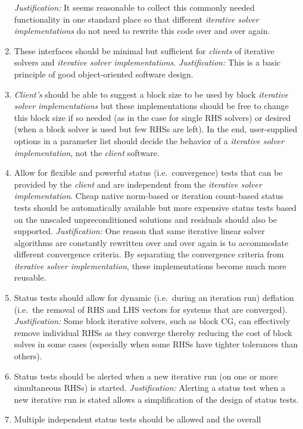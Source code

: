 \documentclass[pdf,ps2pdf,11pt]{SANDreport}
\begin{document}
\begin{enumerate}
{}\textit{Justification:} It seems reasonable to collect this commonly
needed functionality in one standard place so that different
{}\textit{iterative solver implementations} do not need to rewrite
this code over and over again.
\item
These interfaces should be minimal but sufficient for
{}\textit{clients} of iterative solvers and {}\textit{iterative solver
implementations}.  {}\textit{Justification:} This is a basic principle
of good object-oriented software design.
\item
{}\textit{Client's} should be able to suggest a block size to be used
by block {}\textit{iterative solver implementations} but these
implementations should be free to change this block size if so needed
(as in the case for single RHS solvers) or desired (when a block
solver is used but few RHSs are left).  In the end, user-supplied
options in a parameter list should decide the behavior of a
{}\textit{iterative solver implementation}, not the {}\textit{client}
software.
\item
Allow for flexible and powerful status (i.e.~convergence) tests that
can be provided by the {}\textit{client} and are independent from the
{}\textit{iterative solver implementation}.  Cheap native norm-based
or iteration count-based status tests should be automatically
available but more expensive status tests based on the unscaled
unpreconditioned solutions and residuals should also be supported.
{}\textit{Justification:} One reason that same iterative linear solver
algorithms are constantly rewritten over and over again is to
accommodate different convergence criteria.  By separating the
convergence criteria from {}\textit{iterative solver implementation},
these implementations become much more reusable.
\item
Status tests should allow for dynamic (i.e.~during an iteration run)
deflation (i.e.~the removal of RHS and LHS vectors for systems that
are converged).  {}\textit{Justification:} Some block iterative
solvers, such as block CG, can effectively remove individual RHSs as
they converge thereby reducing the cost of block solves in some cases
(especially when some RHSs have tighter tolerances than others).
\item
Status tests should be alerted when a new iterative run (on one or
more simultaneous RHSs) is started.  {}\textit{Justification:}
Alerting a status test when a new iterative run is stated allows a
simplification of the design of status tests.
\item
Multiple independent status tests should be allowed and the overall

\end{enumerate}
\end{document}
